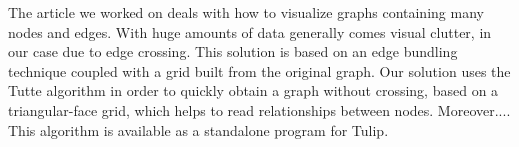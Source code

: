 The article we worked on deals with how to visualize graphs containing many nodes and edges. With huge amounts of data generally comes visual clutter, in our case due to edge crossing. This solution is based on an edge bundling technique coupled with a grid built from the original graph. Our solution uses the Tutte algorithm in order to quickly obtain a graph without crossing, based on a triangular-face grid, which helps to read relationships between nodes. Moreover.... This algorithm is available as a standalone program for Tulip. 
